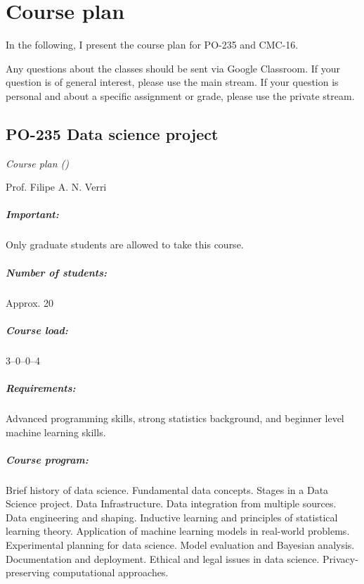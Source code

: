 \chapter{Course plan}

In the following, I present the course plan for PO-235 and CMC-16.

Any questions about the classes should be sent via Google Classroom.  If your question is
of general interest, please use the main stream.  If your question is personal and about
a specific assignment or grade, please use the private stream.

\newpage
\thispagestyle{empty}
\section*{PO-235 Data science project}

\emph{Course plan (\the\year{})}

Prof. Filipe A. N. Verri

\paragraph{Important:} Only graduate students are allowed to take this course.

\paragraph{Number of students:} Approx. 20

\paragraph{Course load:} 3--0--0--4

\paragraph{Requirements:} Advanced programming skills, strong statistics background, and
beginner level machine learning skills.

\paragraph{Course program:}
Brief history of data science.  Fundamental data concepts. Stages in a Data Science
project.  Data Infrastructure. Data integration from multiple sources. Data engineering
and shaping.  Inductive learning and principles of statistical learning theory.
Application of machine learning models in real-world problems.  Experimental planning for
data science. Model evaluation and Bayesian analysis.  Documentation and deployment.
Ethical and legal issues in data science.  Privacy-preserving computational approaches.

